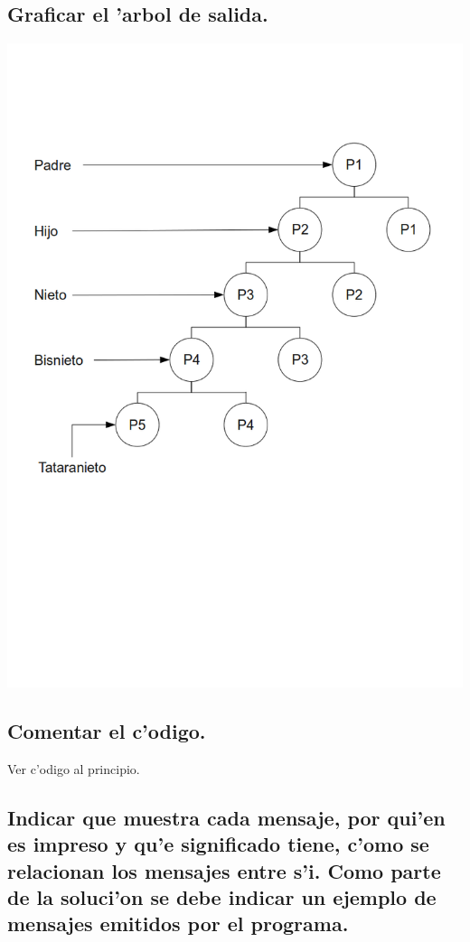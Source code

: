 \documentclass[a4paper,10pt]{article}
\newcommand{\?}{?`}
\begin{document}
\subsection[Punto B]{Graficar el 'arbol de salida.}
\begin{center}
 \includegraphics[scale=0.50,keepaspectratio=true]{./ej1/diagrama-ej1.png}
\end{center}


\subsection[Punto C]{Comentar el c'odigo.}
Ver c'odigo al principio.
\newpage
\subsection[Punto D]{Indicar que muestra cada mensaje, por qui'en es impreso y qu'e significado tiene,
c'omo se relacionan los mensajes entre s'i. Como parte de la soluci'on se debe
indicar un ejemplo de mensajes emitidos por el programa.}
\end{document}

